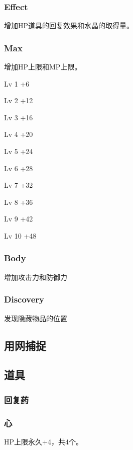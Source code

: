 \documentclass{article}
\begin{document}
\subsubsection{Effect}

增加HP道具的回复效果和水晶的取得量。

\subsubsection{Max}

增加HP上限和MP上限。

Lv 1 +6

Lv 2 +12

Lv 3 +16

Lv 4 +20

Lv 5 +24

Lv 6 +28

Lv 7 +32

Lv 8 +36

Lv 9 +42

Lv 10 +48

\subsubsection{Body}

增加攻击力和防御力

\subsubsection{Discovery}

发现隐藏物品的位置

\subsection{用网捕捉}

\subsection{道具}

\subsubsection{回复药}

\subsubsection{心}

HP上限永久+4，共4个。
\end{document}
